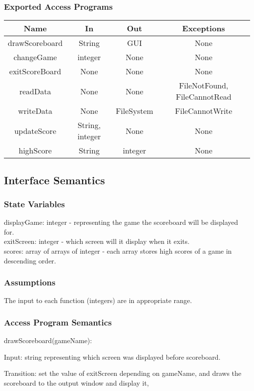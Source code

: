 \documentclass[12pt, titlepage]{article}
\begin{document}
		\subsubsection{Exported Access Programs}
		\begin{tabular}[pos]{|c|c|c|c|}
			\hline
			\textbf{Name}& \textbf{In} & \textbf{Out} & \textbf{Exceptions} \\ \hline
			drawScoreboard & String & GUI & None \\ \hline
			changeGame & integer & None & None \\ \hline
			exitScoreBoard & None & None & None \\ \hline
			readData & None & None & FileNotFound, FileCannotRead \\ \hline
			writeData & None & FileSystem & FileCannotWrite \\ \hline
			updateScore & String, integer & None & None \\ \hline
			highScore & String & integer & None \\ \hline
		\end{tabular}
		\subsection{Interface Semantics}
		\subsubsection{State Variables}
		displayGame: integer - representing the game the scoreboard will be displayed for.\\
		exitScreen: integer - which screen will it display when it exits.\\
		scores: array of arrays of integer - each array stores high scores of a game in descending order.
		\subsubsection{Assumptions}
		The input to each function (integers) are in appropriate range.
		\subsubsection{Access Program Semantics}
		
		drawScoreboard(gameName):
		
		Input: string representing which screen was displayed before scoreboard.
		
		Transition: set the value of exitScreen depending on gameName, and draws the scoreboard to the output window and display it,
		
\end{document}
